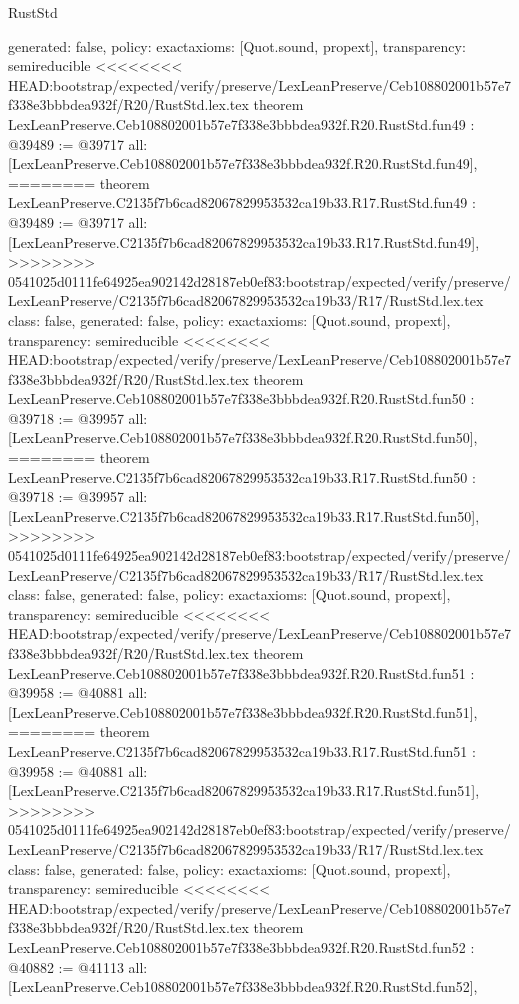 \begin{lexlean}{RustStd}
\begin{coremodule}
{\begin{coremodule}
{{{{{{{{{{{{{{{{{{{{{{{{{{{{{{{{{{{{{{{{{{{{{{{{{{{{  generated: false,
  policy: exact{axioms: [Quot.sound, propext]},
  transparency: semireducible
}
<<<<<<<< HEAD:bootstrap/expected/verify/preserve/LexLeanPreserve/Ceb108802001b57e7f338e3bbbdea932f/R20/RustStd.lex.tex
theorem LexLeanPreserve.Ceb108802001b57e7f338e3bbbdea932f.R20.RustStd.fun49 : @39489 := @39717 {
  all: [LexLeanPreserve.Ceb108802001b57e7f338e3bbbdea932f.R20.RustStd.fun49],
========
theorem LexLeanPreserve.C2135f7b6cad82067829953532ca19b33.R17.RustStd.fun49 : @39489 := @39717 {
  all: [LexLeanPreserve.C2135f7b6cad82067829953532ca19b33.R17.RustStd.fun49],
>>>>>>>> 0541025d0111fe64925ea902142d28187eb0ef83:bootstrap/expected/verify/preserve/LexLeanPreserve/C2135f7b6cad82067829953532ca19b33/R17/RustStd.lex.tex
  class: false,
  generated: false,
  policy: exact{axioms: [Quot.sound, propext]},
  transparency: semireducible
}
<<<<<<<< HEAD:bootstrap/expected/verify/preserve/LexLeanPreserve/Ceb108802001b57e7f338e3bbbdea932f/R20/RustStd.lex.tex
theorem LexLeanPreserve.Ceb108802001b57e7f338e3bbbdea932f.R20.RustStd.fun50 : @39718 := @39957 {
  all: [LexLeanPreserve.Ceb108802001b57e7f338e3bbbdea932f.R20.RustStd.fun50],
========
theorem LexLeanPreserve.C2135f7b6cad82067829953532ca19b33.R17.RustStd.fun50 : @39718 := @39957 {
  all: [LexLeanPreserve.C2135f7b6cad82067829953532ca19b33.R17.RustStd.fun50],
>>>>>>>> 0541025d0111fe64925ea902142d28187eb0ef83:bootstrap/expected/verify/preserve/LexLeanPreserve/C2135f7b6cad82067829953532ca19b33/R17/RustStd.lex.tex
  class: false,
  generated: false,
  policy: exact{axioms: [Quot.sound, propext]},
  transparency: semireducible
}
<<<<<<<< HEAD:bootstrap/expected/verify/preserve/LexLeanPreserve/Ceb108802001b57e7f338e3bbbdea932f/R20/RustStd.lex.tex
theorem LexLeanPreserve.Ceb108802001b57e7f338e3bbbdea932f.R20.RustStd.fun51 : @39958 := @40881 {
  all: [LexLeanPreserve.Ceb108802001b57e7f338e3bbbdea932f.R20.RustStd.fun51],
========
theorem LexLeanPreserve.C2135f7b6cad82067829953532ca19b33.R17.RustStd.fun51 : @39958 := @40881 {
  all: [LexLeanPreserve.C2135f7b6cad82067829953532ca19b33.R17.RustStd.fun51],
>>>>>>>> 0541025d0111fe64925ea902142d28187eb0ef83:bootstrap/expected/verify/preserve/LexLeanPreserve/C2135f7b6cad82067829953532ca19b33/R17/RustStd.lex.tex
  class: false,
  generated: false,
  policy: exact{axioms: [Quot.sound, propext]},
  transparency: semireducible
}
<<<<<<<< HEAD:bootstrap/expected/verify/preserve/LexLeanPreserve/Ceb108802001b57e7f338e3bbbdea932f/R20/RustStd.lex.tex
theorem LexLeanPreserve.Ceb108802001b57e7f338e3bbbdea932f.R20.RustStd.fun52 : @40882 := @41113 {
  all: [LexLeanPreserve.Ceb108802001b57e7f338e3bbbdea932f.R20.RustStd.fun52],
}}}}}}}}}}}}}}}}}}}}}}}}}}}}}}}}}}}}}}}}}}}}}}}}}}}}}}}
\end{coremodule}}
\end{coremodule}
\end{lexlean}
